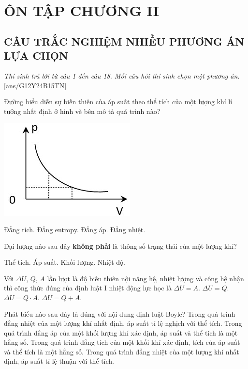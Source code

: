\section*{ÔN TẬP CHƯƠNG II}
\subsection{CÂU TRẮC NGHIỆM NHIỀU PHƯƠNG ÁN LỰA CHỌN}
\textit{Thí sinh trả lời từ câu 1 đến câu 18. Mỗi câu hỏi thí sinh chọn một phương án.}
[ans/G12Y24B15TN]
\begin{ex}
Đường biểu diễn sự biến thiên của áp suất theo thể tích của một lượng khí lí tưởng nhất định ở hình vẽ bên mô tả quá trình nào?
\begin{center}
	\includegraphics[width=0.35\linewidth]{../figs/VN12-Y24-PH-SYL-016-1}
\end{center}	
	\choice
	{Đẳng tích.}
	{Đẳng entropy.}
	{Đẳng áp.}
	{\True Đẳng nhiệt.}
	\loigiai{}
\end{ex}
\begin{ex}
	Đại lượng nào sau đây \textbf{không phải} là thông số trạng thái của một lượng khí?
	
	\choice
	{Thể tích.}
	{Áp suất.}
	{\True Khối lượng.}
	{Nhiệt độ.}
	\loigiai{}
\end{ex}
\begin{ex}
	Với $\Delta U$, $Q$, $A$ lần lượt là độ biến thiên nội năng hệ, nhiệt lượng và công hệ nhận thì công thức đúng của định luật I nhiệt động lực học là
	\choice
	{$\Delta U=A$.}
	{$\Delta U=Q$.}
	{$\Delta U=Q\cdot A$.}
	{\True $\Delta U=Q+A$.}
	\loigiai{}
\end{ex}
\begin{ex}
Phát biểu nào sau đây là đúng với nội dung định luật Boyle?	
	\choice
	{\True Trong quá trình đẳng nhiệt của một lượng khí nhất định, áp suất tỉ lệ nghịch với thể tích.}
	{Trong quá trình đẳng áp của một khối lượng khí xác định, áp suất và thể tích là một hằng số.}
	{Trong quá trình đẳng tích của một khối khí xác định, tích của áp suất và thể tích là một hằng số.}
	{Trong quá trình đẳng nhiệt của một lượng khí nhất định, áp suất tỉ lệ thuận với thể tích.}
	\loigiai{}
\end{ex}
